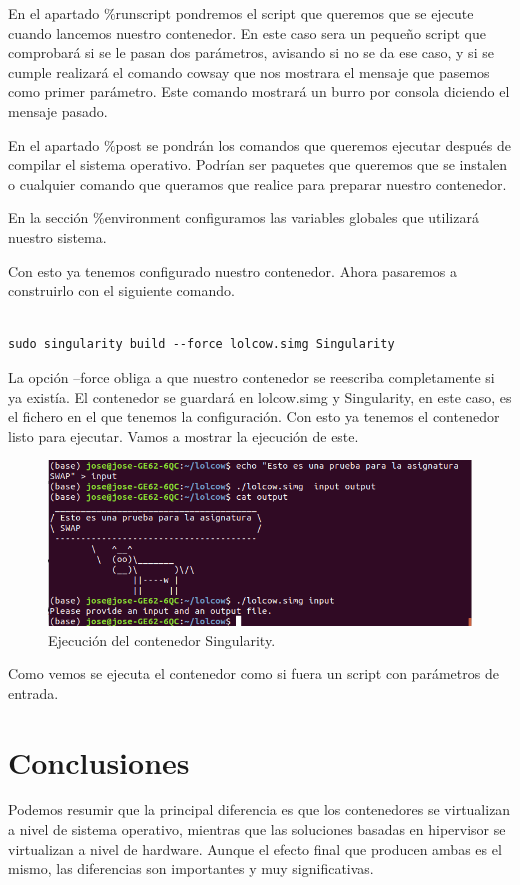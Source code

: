 \documentclass[11pt,a4paper]{article}
\begin{document}
En el apartado  \%runscript pondremos el script que queremos que se ejecute cuando lancemos nuestro contenedor. En este caso sera un pequeño script que comprobará si se le pasan dos parámetros, avisando si no se da ese caso, y si se cumple realizará el comando cowsay que nos mostrara el mensaje que pasemos como primer parámetro. Este comando mostrará un burro por consola diciendo el mensaje pasado.

En el apartado \%post se pondrán los comandos que queremos ejecutar después de compilar el sistema operativo. Podrían ser paquetes que queremos que se instalen o cualquier comando que queramos que realice para preparar nuestro contenedor. 

En la sección \%environment configuramos las variables globales que utilizará nuestro sistema. 

Con esto ya tenemos configurado nuestro contenedor. Ahora pasaremos a construirlo con el siguiente comando.
\begin{verbatim}

sudo singularity build --force lolcow.simg Singularity
\end{verbatim}

La opción --force obliga a que nuestro contenedor se reescriba completamente si ya existía. El contenedor se guardará en lolcow.simg y Singularity, en este caso, es el fichero en el que tenemos la configuración. Con esto ya tenemos el contenedor listo para ejecutar. Vamos a mostrar la ejecución de este.

\begin{figure}[H]
	\centering
	\includegraphics[scale=0.5]{images/ejecucionSin.png}
	\caption[Ejecución Singularity]{Ejecución del contenedor Singularity.}
	\label{fig:ejecucionSin}
\end{figure}

Como vemos se ejecuta el contenedor como si fuera un script con parámetros de entrada. 

\section{Conclusiones}
Podemos resumir que la principal diferencia es que los contenedores se virtualizan a nivel de sistema operativo, mientras que las soluciones basadas en hipervisor se virtualizan a nivel de hardware. Aunque el efecto final que producen ambas es el mismo, las diferencias son importantes y muy significativas.
\end{document}

